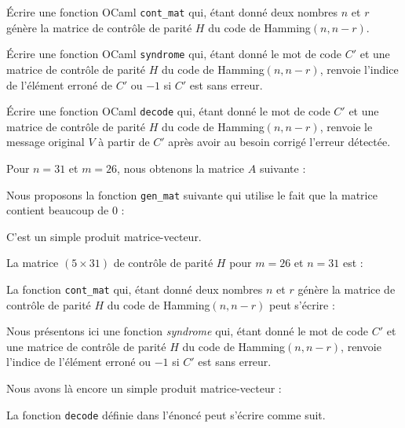 Écrire une fonction OCaml \texttt{cont\_mat} qui, étant donné deux nombres $n$ et $r$ génère la matrice de contrôle de parité $H$ du code de Hamming$(n,n-r)$.

\Q
Écrire une fonction OCaml \texttt{syndrome} qui, étant donné le mot de code $C'$ et une matrice de contrôle de parité $H$ du code de Hamming$(n,n-r)$, renvoie l'indice de l'élément erroné de $C'$ ou $-1$ si $C'$ est sans erreur.
\medskip

Écrire une fonction OCaml \texttt{decode} qui, étant donné le mot de code $C'$ et une matrice de contrôle de parité $H$ du code de Hamming$(n,n-r)$, renvoie le message original $V$ à partir de $C'$ après avoir au besoin corrigé l'erreur détectée.

\Corrige

\Q
Pour $n=31$ et $m=26$, nous obtenons la matrice $A$ suivante :




Nous proposons la fonction \texttt{gen\_mat} suivante qui utilise le fait que la matrice contient beaucoup de 0 :



\Q
C'est un simple produit matrice-vecteur.



\Q
La matrice $(5 \times 31)$ de contrôle de parité $H$ pour $m=26$ et $n=31$ est :


\medskip

La fonction \texttt{cont\_mat} qui, étant donné deux nombres $n$ et $r$ génère la matrice de contrôle de parité $H$ du code de Hamming$(n,n-r)$ peut s'écrire :



\Q
Nous présentons ici une fonction \textit{syndrome} qui, étant donné le mot de code $C'$ et une matrice de contrôle de parité $H$ du code de Hamming$(n,n-r)$, renvoie l'indice de l'élément erroné ou $-1$ si $C'$ est sans erreur.
\medskip

Nous avons là encore un simple produit matrice-vecteur :



La fonction \texttt{decode} définie dans l'énoncé peut s'écrire comme suit.



\Fin
